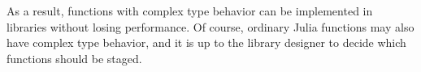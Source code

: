 \documentclass[9pt]{sigplanconf}
\begin{document}
As a result, functions with complex type behavior can be implemented
in libraries without losing performance. Of course, ordinary Julia
functions may also have complex type behavior, and it is up to the
library designer to decide which functions should be staged.







\end{document}
